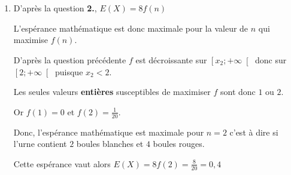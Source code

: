 \begin{corrige}
\begin{enumerate}
\begin{enumerate}
\begin{center}
\end{center}

               \item
               D'après la question \textbf{2.}, $E(X)=8f(n)$
               \par
               L'espérance mathématique est donc maximale pour la valeur de $n$ qui maximise $f(n)$.
               \par
               D'après la question précédente $f$ est décroissante sur $\left[x_2;+\infty\right[$ donc sur $\left[2;+\infty\right[$ puisque $x_2  < 2$.
               \par
               Les seules valeurs \textbf{entières} susceptibles de maximiser $f$ sont donc $1$ ou $2$.
               \par
               Or $f(1)=0$ et $f(2)=\frac{1}{20}$.
               \par
               Donc, l'espérance mathématique est maximale pour $n=2$ c'est à dire si l'urne contient $2$ boules blanches et $4$ boules rouges.
               \par
               Cette espérance vaut alors $E(X)=8f(2)=\frac{8}{20}=0,4$
          \end{enumerate}
     \end{enumerate}
\end{corrige} 
